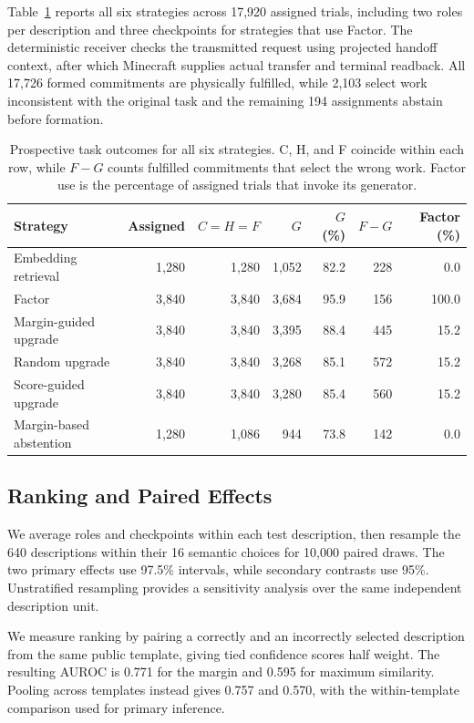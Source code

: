 \documentclass[sigconf,nonacm,balance=false]{aamas}
\newcommand{\tabstyle}{\small\setlength{\tabcolsep}{3pt}\renewcommand{\arraystretch}{1.10}}
\begin{document}
Table~\ref{tab:selection-quality-full} reports all six strategies across 17,920 assigned trials, including two roles per description and three checkpoints for strategies that use Factor. The deterministic receiver checks the transmitted request using projected handoff context, after which Minecraft supplies actual transfer and terminal readback. All 17,726 formed commitments are physically fulfilled, while 2,103 select work inconsistent with the original task and the remaining 194 assignments abstain before formation.
\begin{table}[!htbp]
\centering\tabstyle
\caption{Prospective task outcomes for all six strategies. C, H, and F coincide within each row, while $F-G$ counts fulfilled commitments that select the wrong work. Factor use is the percentage of assigned trials that invoke its generator.}
\label{tab:selection-quality-full}
\begin{tabular}{@{}lrrrrrr@{}}
\toprule
\textbf{Strategy} & \textbf{Assigned} & $C=H=F$ & $G$ & $G$ (\%) & $F-G$ & \textbf{Factor} (\%)\\
\midrule
Embedding retrieval & 1,280 & 1,280 & 1,052 & 82.2 & 228 & 0.0\\
Factor & 3,840 & 3,840 & 3,684 & 95.9 & 156 & 100.0\\
Margin-guided upgrade & 3,840 & 3,840 & 3,395 & 88.4 & 445 & 15.2\\
Random upgrade & 3,840 & 3,840 & 3,268 & 85.1 & 572 & 15.2\\
Score-guided upgrade & 3,840 & 3,840 & 3,280 & 85.4 & 560 & 15.2\\
Margin-based abstention & 1,280 & 1,086 & 944 & 73.8 & 142 & 0.0\\
\bottomrule
\end{tabular}
\end{table}

\subsection{Ranking and Paired Effects}
We average roles and checkpoints within each test description, then resample the 640 descriptions within their 16 semantic choices for 10,000 paired draws. The two primary effects use 97.5\% intervals, while secondary contrasts use 95\%. Unstratified resampling provides a sensitivity analysis over the same independent description unit.

We measure ranking by pairing a correctly and an incorrectly selected description from the same public template, giving tied confidence scores half weight. The resulting AUROC is 0.771 for the margin and 0.595 for maximum similarity. Pooling across templates instead gives 0.757 and 0.570, with the within-template comparison used for primary inference.
\end{document}
